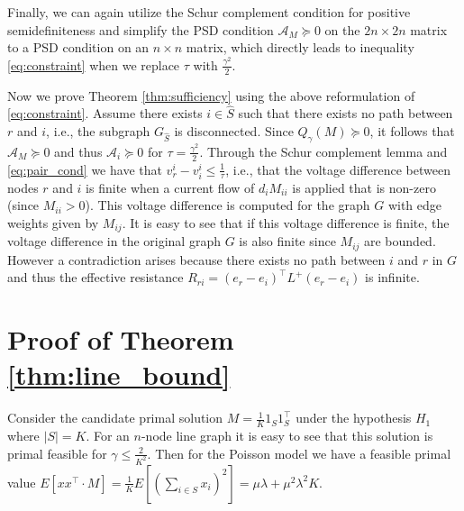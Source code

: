 \documentclass{article}
\begin{document}
Finally, we can again utilize the Schur complement condition for positive semidefiniteness and simplify the PSD condition $\mathcal{A}_M \succeq 0$ on the $2n \times 2n$ matrix to a PSD condition on an $n \times n$ matrix, which directly leads to inequality \eqref{eq:constraint} when we replace $\tau$ with $\frac{\gamma^2}{2}$.

Now we prove Theorem \ref{thm:sufficiency} using the above reformulation of \eqref{eq:constraint}. Assume there exists $i \in \hat{S}$ such that there exists no path between $r$ and $i$, i.e., the subgraph $G_{\hat{S}}$ is disconnected. Since $Q_\gamma(M) \succeq 0$, it follows that $\mathcal{A}_M \succeq 0$ and thus $\mathcal{A}_i \succeq 0$ for $\tau = \frac{\gamma^2}{2}$. Through the Schur complement lemma and \eqref{eq:pair_cond} we have that $v_r^i - v_i^i \leq \frac{1}{\tau}$, i.e., that the voltage difference between nodes $r$ and $i$ is finite when a current flow of $d_i M_{ii}$ is applied that is non-zero (since $M_{ii} > 0$). This voltage difference is computed for the graph $G$ with edge weights given by $M_{ij}$. It is easy to see that if this voltage difference is finite, the voltage difference in the original graph $G$ is also finite since $M_{ij}$ are bounded. However a contradiction arises because there exists no path between $i$ and $r$ in $G$ and thus the effective resistance $R_{ri} = (e_r - e_i)^\top L^+ (e_r - e_i)$ is infinite.


\section{Proof of Theorem \ref{thm:line_bound}}

Consider the candidate primal solution $M = \frac{1}{K} 1_S 1_S^\top$ under the hypothesis $H_1$ where $|S| = K$. For an $n$-node line graph it is easy to see that this solution is primal feasible for $\gamma \leq \frac{2}{K^2}$. Then for the Poisson model we have a feasible primal value $E[ x x^\top \cdot M] = \frac{1}{K} E[(\sum_{i \in S} x_i)^2 ] = \mu \lambda + \mu^2 \lambda^2 K$.
\end{document}
